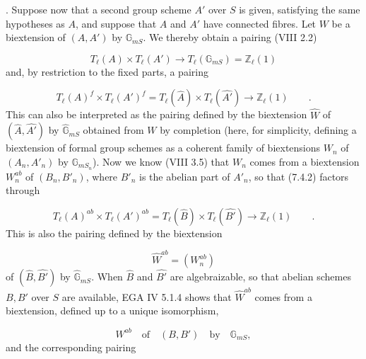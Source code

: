 
\medskip
{}. Suppose now that a second group scheme $A'$ over $S$ is given,
satisfying the same hypotheses as $A$, and suppose that $A$ and $A'$
have connected fibres. Let $W$ be a biextension of $(A,A')$ by
$\mathbb G_{mS}$. We thereby obtain a pairing (VIII 2.2)

\begin{equation}\tag{7.4.1}
T_{\ell}(A) \times T_{\ell}(A') \longrightarrow
T_{\ell}(\mathbb G_{mS}) = \mathbb Z_{\ell}(1)
\end{equation}
and, by restriction to the fixed parts, a pairing

\begin{equation}\tag{7.4.2}
T_{\ell}(A)^{f} \times T_{\ell}(A')^{f}
 = T_{\ell}(\widehat A) \times T_{\ell}(\widehat {A'})
 \longrightarrow \mathbb Z_{\ell}(1) \qquad .
\end{equation}
This can also be interpreted as the pairing defined by the
biextension $\widehat W$ of $(\widehat A,\widehat {A'})$ by
$\widehat{\mathbb G}_{mS}$ obtained from $W$ by completion (here, for
simplicity, defining a biextension of formal group schemes as a
coherent family of biextensions $W_n$ of $(A_n,A'_n)$ by
$\mathbb G_{mS_n}$). Now we know (VIII 3.5) that $W_n$ comes from a
biextension $W_n^{ab}$ of $(B_n,B'_n)$, where $B'_n$ is the abelian
part of $A'_n$, so that (7.4.2) factors through

\begin{equation}\tag{7.4.3}
T_{\ell}(A)^{ab} \times T_{\ell}(A')^{ab}
 = T_{\ell}(\widehat B) \times T_{\ell}(\widehat {B'})
 \longrightarrow \mathbb Z_{\ell}(1) \qquad .
\end{equation}
This is also the pairing defined by the biextension

\begin{equation*}
\widehat W^{ab}=(W_n^{ab})
\end{equation*}
of $(\widehat B,\widehat {B'})$ by $\widehat{\mathbb G}_{mS}$. When
$\widehat B$ and $\widehat {B'}$ are algebraizable, so that abelian
schemes $B,B'$ over $S$ are available, EGA IV 5.1.4 shows that
$\widehat W^{ab}$ comes from a biextension, defined up to a unique
isomorphism,

\begin{equation*}
W^{ab}\quad\text{of}\quad(B,B')\quad\text{by}\quad\mathbb G_{mS},
\end{equation*}
and the corresponding pairing


